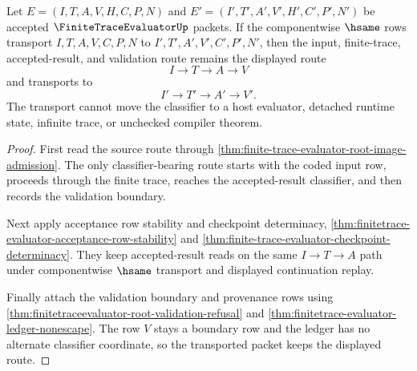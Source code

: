 \begin{theorem}
\label{thm:finite-trace-evaluator-root-classifier-transport}
Let $E=(I,T,A,V,H,C,P,N)$ and $E'=(I',T',A',V',H',C',P',N')$ be accepted $\FiniteTraceEvaluatorUp$ packets. If the componentwise $\hsame$ rows transport $I,T,A,V,C,P,N$ to $I',T',A',V',C',P',N'$, then the input, finite-trace, accepted-result, and validation route remains the displayed route
$$
I \to T \to A \to V
$$
and transports to
$$
I' \to T' \to A' \to V'.
$$
The transport cannot move the classifier to a host evaluator, detached runtime state, infinite trace, or unchecked compiler theorem.
\end{theorem}
\begin{proof}
First read the source route through \autoref{thm:finite-trace-evaluator-root-image-admission}. The only classifier-bearing route starts with the coded input row, proceeds through the finite trace, reaches the accepted-result classifier, and then records the validation boundary.

Next apply acceptance row stability and checkpoint determinacy, \autoref{thm:finitetrace-evaluator-acceptance-row-stability} and \autoref{thm:finite-trace-evaluator-checkpoint-determinacy}. They keep accepted-result reads on the same $I \to T \to A$ path under componentwise $\hsame$ transport and displayed continuation replay.

Finally attach the validation boundary and provenance rows using \autoref{thm:finitetraceevaluator-root-validation-refusal} and \autoref{thm:finitetrace-evaluator-ledger-nonescape}. The row $V$ stays a boundary row and the ledger has no alternate classifier coordinate, so the transported packet keeps the displayed route.
\end{proof}

